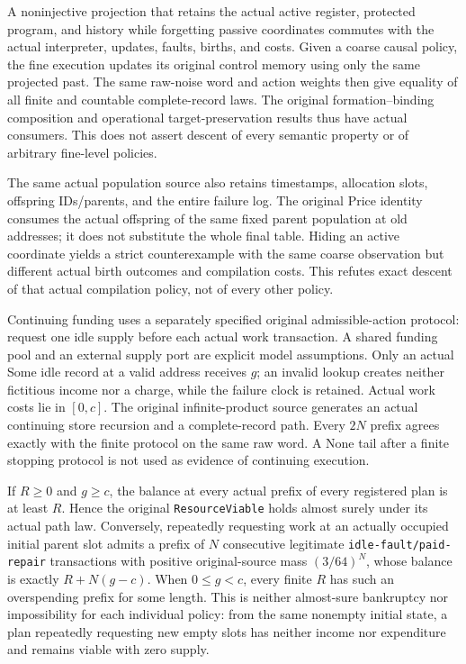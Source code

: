\documentclass[
  english,
  11pt,
  oneside]{book}
\newcounter{none} %
\begin{document}
A noninjective projection that retains the actual active register, protected program, and history while forgetting passive coordinates commutes with the actual interpreter, updates, faults, births, and costs. Given a coarse causal policy, the fine execution updates its original control memory using only the same projected past. The same raw-noise word and action weights then give equality of all finite and countable complete-record laws. The original formation--binding composition and operational target-preservation results thus have actual consumers. This does not assert descent of every semantic property or of arbitrary fine-level policies.

The same actual population source also retains timestamps, allocation slots, offspring IDs/parents, and the entire failure log. The original Price identity consumes the actual offspring of the same fixed parent population at old addresses; it does not substitute the whole final table. Hiding an active coordinate yields a strict counterexample with the same coarse observation but different actual birth outcomes and compilation costs. This refutes exact descent of that actual compilation policy, not of every other policy.

Continuing funding uses a separately specified original admissible-action protocol: request one idle supply before each actual work transaction. A shared funding pool and an external supply port are explicit model assumptions. Only an actual Some idle record at a valid address receives \(g\); an invalid lookup creates neither fictitious income nor a charge, while the failure clock is retained. Actual work costs lie in \([0,c]\). The original infinite-product source generates an actual continuing store recursion and a complete-record path. Every \(2N\) prefix agrees exactly with the finite protocol on the same raw word. A None tail after a finite stopping protocol is not used as evidence of continuing execution.

If \(R\ge0\) and \(g\ge c\), the balance at every actual prefix of every registered plan is at least \(R\). Hence the original \nolinkurl{ResourceViable} holds almost surely under its actual path law. Conversely, repeatedly requesting work at an actually occupied initial parent slot admits a prefix of \(N\) consecutive legitimate \nolinkurl{idle-fault/paid-repair} transactions with positive original-source mass \((3/64)^N\), whose balance is exactly \(R+N(g-c)\). When \(0\le g<c\), every finite \(R\) has such an overspending prefix for some length. This is neither almost-sure bankruptcy nor impossibility for each individual policy: from the same nonempty initial state, a plan repeatedly requesting new empty slots has neither income nor expenditure and remains viable with zero supply.
\end{document}
